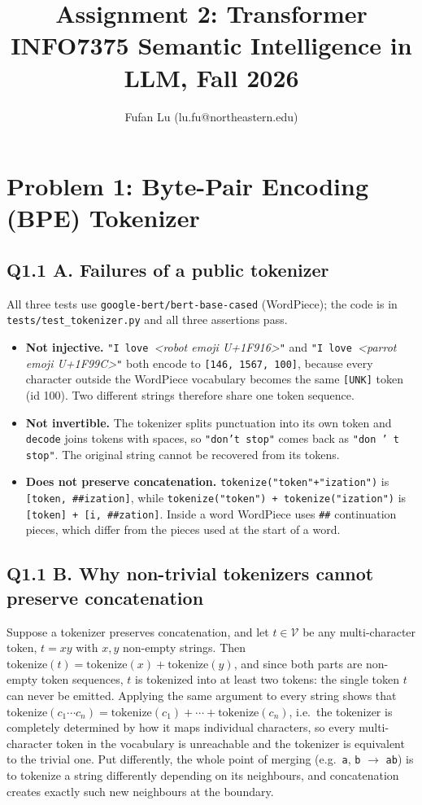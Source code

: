 \documentclass[11pt]{article}
\title{Assignment 2: Transformer\\\large INFO7375 Semantic Intelligence in LLM, Fall 2026}
\author{Fufan Lu (lu.fu@northeastern.edu)}
\date{}
\begin{document}
\maketitle

\section*{Problem 1: Byte-Pair Encoding (BPE) Tokenizer}

\subsection*{Q1.1 A. Failures of a public tokenizer}
All three tests use \texttt{google-bert/bert-base-cased} (WordPiece); the code is in \texttt{tests/test\_tokenizer.py} and all three assertions pass.
\begin{itemize}
  \item \textbf{Not injective.} \texttt{"I love }\textit{<robot emoji U+1F916>}\texttt{"} and \texttt{"I love }\textit{<parrot emoji U+1F99C>}\texttt{"} both encode to \texttt{[146, 1567, 100]}, because every character outside the WordPiece vocabulary becomes the same \texttt{[UNK]} token (id 100). Two different strings therefore share one token sequence.
  \item \textbf{Not invertible.} The tokenizer splits punctuation into its own token and \texttt{decode} joins tokens with spaces, so \texttt{"don't stop"} comes back as \texttt{"don ' t stop"}. The original string cannot be recovered from its tokens.
  \item \textbf{Does not preserve concatenation.} \texttt{tokenize("token"+"ization")} is \texttt{[token, \#\#ization]}, while \texttt{tokenize("token") + tokenize("ization")} is \texttt{[token] + [i, \#\#zation]}. Inside a word WordPiece uses \texttt{\#\#} continuation pieces, which differ from the pieces used at the start of a word.
\end{itemize}

\subsection*{Q1.1 B. Why non-trivial tokenizers cannot preserve concatenation}
Suppose a tokenizer preserves concatenation, and let $t \in \mathcal{V}$ be any multi-character token, $t = xy$ with $x, y$ non-empty strings. Then $\text{tokenize}(t) = \text{tokenize}(x) + \text{tokenize}(y)$, and since both parts are non-empty token sequences, $t$ is tokenized into at least two tokens: the single token $t$ can never be emitted. Applying the same argument to every string shows that $\text{tokenize}(c_1 \cdots c_n) = \text{tokenize}(c_1) + \cdots + \text{tokenize}(c_n)$, i.e.\ the tokenizer is completely determined by how it maps individual characters, so every multi-character token in the vocabulary is unreachable and the tokenizer is equivalent to the trivial one. Put differently, the whole point of merging (e.g.\ \texttt{a}, \texttt{b} $\to$ \texttt{ab}) is to tokenize a string differently depending on its neighbours, and concatenation creates exactly such new neighbours at the boundary.
\end{document}
